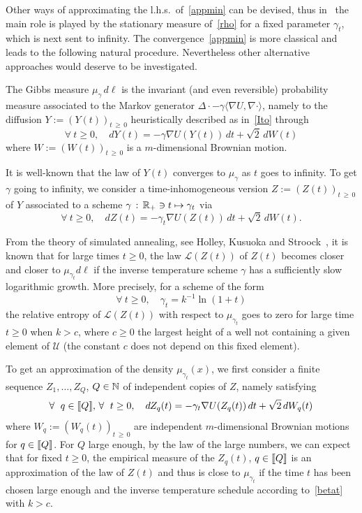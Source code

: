\documentclass[AHL,Unicode,longabstracts,published]{cedram}
\newcommand{\cL}{\mathcal{L}}
\newcommand{\cU}{\mathcal{U}}
\newcommand{\NN}{\mathbb{N}}
\newcommand{\RR}{\mathbb{R}}
\newcommand{\na}{\nabla}
\newcommand{\tr}{\Delta}
\newcommand{\fo}{\forall\ }
\let\oldin\in
\renewcommand{\in}{\mathchoice{\oldin}{\oldin}{\,\oldin\,}{\,\oldin\,}}
\let\oldmapsto\mapsto
\renewcommand*{\mapsto}{\mathchoice{\longmapsto}{\oldmapsto}{\oldmapsto}{\oldmapsto}}
\let\oldforall\forall
\renewcommand*{\forall}{\mathrel{\oldforall}}
\newcommand{\llbracket}{\mathopen{[\mkern -2.7mu[}}
\newcommand{\rrbracket}{\mathclose{]\mkern -2.7mu]}}
\newcommand{\lin}{\llbracket}
\newcommand{\rin}{\rrbracket}
\begin{document}
Other ways of approximating the l.h.s.\ of~\eqref{appmin} can be devised, thus in~\cite{https://doi.org/10.48550/arxiv.2204.01306} the main role is played by the stationary measure of~\eqref{rho} for a fixed parameter $\gamma_t$, which is next sent to infinity. The convergence~\eqref{appmin} is more classical and leads to the following natural procedure. Nevertheless other alternative approaches would deserve to be investigated.

\goodbreak
The Gibbs measure $\mu_\gamma\, d\ell$ is the invariant (and even reversible) probability measure associated to the Markov generator $\tr\cdot-\gamma\langle\na U,\na\cdot\rangle$, namely to the diffusion $Y:=(Y(t))_{t\,\geq\,0}$ heuristically described as in~\eqref{Ito} through
\begin{equation*}
\fo t\geq 0,\quad dY(t) = -\gamma\na U(Y(t))\, dt+\sqrt{2}\,dW(t)
\end{equation*}
where $W:= (W(t))_{t\,\geq\,0}$ is a $m$-dimensional Brownian motion.


It is well-known that the law of $Y(t)$ converges to $\mu_\gamma$ as $t$ goes to infinity. To get $\gamma$ going to infinity, we consider a time-inhomogeneous version $Z:=(Z(t))_{t\,\geq\,0}$ of $Y$ associated to a scheme $\gamma\,:\, \RR_+\ni t\mapsto \gamma_t$ via
\begin{equation*}
\fo t\geq 0,\quad dZ(t) = -\gamma_t\na U(Z(t))\, dt+\sqrt{2}\,dW(t).
\end{equation*}


From the theory of simulated annealing, see Holley, Kusuoka and Stroock~\cite{MR995752}, it is known that for large times $t\geq 0$, the law $\cL(Z(t))$ of $Z(t)$ becomes closer and closer to $\mu_{\gamma_t}d\ell$ if the inverse temperature scheme $\gamma$ has a sufficiently slow logarithmic growth. More precisely, for a scheme of the form
\begin{equation}\label{betat}
\fo t\geq 0,\quad \gamma_t = k^{-1}\ln(1+t)
\end{equation}
the relative entropy of $\cL(Z(t))$ with respect to $\mu_{\gamma_t}$ goes to zero for large time $t\geq 0$ when $k>c$, where $c\geq 0$ the largest height of a well not containing a given element of $\cU$ (the constant $c$ does not depend on this fixed element).


To get an approximation of the density $\mu_{\gamma_t}(x)$, we first consider a finite sequence $Z_1,\dots, Z_Q$, $Q\in\NN$ of independent copies of $Z$, namely satisfying
\begin{equation*}
\fo q\in\lin Q\rin,\,\fo t\geq 0,\quad dZ_q(t) = -\gamma_t\na U(Z_q(t))\, dt+\sqrt{2}\,dW_q(t)
\end{equation*}
where $W_q:= (W_q(t))_{t\,\geq\,0}$ are independent $m$-dimensional Brownian motions for $q\in\lin Q\rin$. For $Q$ large enough, by the law of the large numbers, we can expect that for fixed $t\geq 0$, the empirical measure of the $Z_q(t)$, $q\in\lin Q\rin$ is an approximation of the law of $Z(t)$ and thus is close to $\mu_{\gamma_t}$ if the time $t$ has been chosen large enough and the inverse temperature schedule according to~\eqref{betat} with $k>c$.
\end{document}
